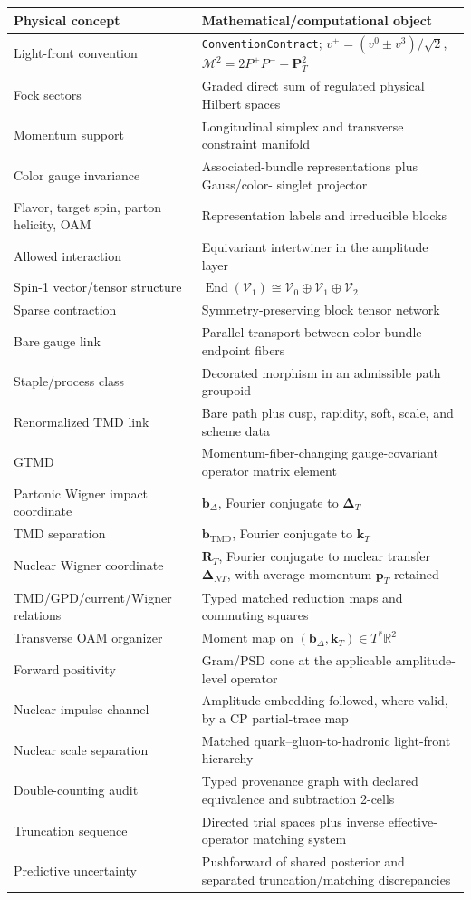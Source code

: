 \documentclass[11pt]{article}
\newcommand{\kT}{\bm{k}_{T}}
\newcommand{\pT}{\bm{p}_{T}}
\newcommand{\DT}{\bm{\Delta}_{T}}
\newcommand{\DNT}{\bm{\Delta}_{N T}}
\newcommand{\bD}{\bm{b}_{\Delta}}
\newcommand{\bM}{\bm{b}_{\mathrm{TMD}}}
\newcommand{\RT}{\bm{R}_{T}}
\newcommand{\End}{\operatorname{End}}
\newcommand{\Rep}{\mathcal V}
\newcommand{\cM}{\mathcal M}
\begin{document}
\begin{tabularx}{\textwidth}{L{0.31\textwidth}Y}
\toprule
Physical concept & Mathematical/computational object\\
\midrule
Light-front convention & \texttt{ConventionContract};
\(v^\pm=(v^0\pm v^3)/\sqrt2\),
\(\cM^2=2P^+P^- -\bm P_T^2\)\\
Fock sectors & Graded direct sum of regulated physical Hilbert spaces\\
Momentum support & Longitudinal simplex and transverse constraint manifold\\
Color gauge invariance & Associated-bundle representations plus Gauss/color-
singlet projector\\
Flavor, target spin, parton helicity, OAM & Representation labels and
irreducible blocks\\
Allowed interaction & Equivariant intertwiner in the amplitude layer\\
Spin-1 vector/tensor structure &
\(\End(\Rep_1)\cong\Rep_0\oplus\Rep_1\oplus\Rep_2\)\\
Sparse contraction & Symmetry-preserving block tensor network\\
Bare gauge link & Parallel transport between color-bundle endpoint fibers\\
Staple/process class & Decorated morphism in an admissible path groupoid\\
Renormalized TMD link & Bare path plus cusp, rapidity, soft, scale, and scheme
data\\
GTMD & Momentum-fiber-changing gauge-covariant operator matrix element\\
Partonic Wigner impact coordinate & \(\bD\), Fourier conjugate to \(\DT\)\\
TMD separation & \(\bM\), Fourier conjugate to \(\kT\)\\
Nuclear Wigner coordinate & \(\RT\), Fourier conjugate to nuclear transfer \(\DNT\), with average momentum \(\pT\) retained\\
TMD/GPD/current/Wigner relations & Typed matched reduction maps and commuting
squares\\
Transverse OAM organizer & Moment map on \((\bD,\kT)\in T^*\mathbb R^2\)\\
Forward positivity & Gram/PSD cone at the applicable amplitude-level operator\\
Nuclear impulse channel & Amplitude embedding followed, where valid, by a CP
partial-trace map\\
Nuclear scale separation & Matched quark--gluon-to-hadronic light-front
hierarchy\\
Double-counting audit & Typed provenance graph with declared equivalence and
subtraction 2-cells\\
Truncation sequence & Directed trial spaces plus inverse effective-operator
matching system\\
Predictive uncertainty & Pushforward of shared posterior and separated
truncation/matching discrepancies\\
\bottomrule
\end{tabularx}
\end{document}
